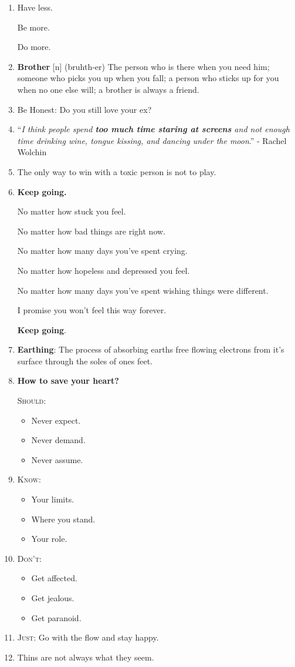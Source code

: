 \documentclass{article}
\numberwithin{equation}{section}
\begin{document}
\begin{enumerate}
    \textit{\textbf{Be offended} by war, poverty, greed and injustice}. - Sue Fitzmaurice
    \item Have less.
    
    Be more.
    
    Do more.
    \item \textbf{Brother} [n] (bruhth-er) The person who is there when you need him; someone who picks you up when you fall; a person who sticks up for you when no one else will; a brother is always a friend.
    \item Be Honest: Do you still love your ex?
    \item ``\textit{I think people spend \textbf{too much time staring at screens} and not enough time drinking wine, tongue kissing, and dancing under the moon}.'' - Rachel Wolchin
    \item The only way to win with a toxic person is not to play.
    \item \textbf{Keep going.}
    
    No matter how stuck you feel.
    
    No matter how bad things are right now.
    
    No matter how many days you've spent crying.
    
    No matter how hopeless and depressed you feel.
    
    No matter how many days you've spent wishing things were different.
    
    I promise you won't feel this way forever.
    
    \textbf{Keep going}.
    \item \textbf{Earthing}: The process of absorbing earths free flowing electrons from it's surface through the soles of ones feet.
    \item \textbf{How to save your heart?}
    
    \textsc{Should}:
    \begin{itemize}
        \item Never expect.
        \item Never demand.
        \item Never assume.
    \end{itemize}
    \item \textsc{Know}:
    \begin{itemize}
        \item Your limits.
        \item Where you stand.
        \item Your role.
    \end{itemize}
    \item \textsc{Don't}:
    \begin{itemize}
        \item Get affected.
        \item Get jealous.
        \item Get paranoid.
    \end{itemize}
    \item \textsc{Just}: Go with the flow and stay happy.
    \item Thins are not always what they seem.
    

\end{enumerate}
\end{document}
